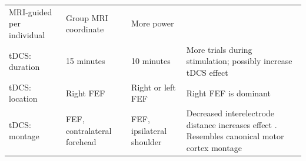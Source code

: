 \documentclass[11pt,]{memoir}
\begin{document}
\begin{longtable}[]{@{}llll@{}}
\begin{minipage}[t]{0.21\columnwidth}
MRI-guided per individual\strut
\end{minipage} & \begin{minipage}[t]{0.16\columnwidth}\raggedright
Group MRI coordinate\strut
\end{minipage} & \begin{minipage}[t]{0.38\columnwidth}\raggedright
More power \autocite{Sack2009}\strut
\end{minipage}\tabularnewline
\begin{minipage}[t]{0.14\columnwidth}\raggedright
tDCS: duration\strut
\end{minipage} & \begin{minipage}[t]{0.21\columnwidth}\raggedright
15 minutes\strut
\end{minipage} & \begin{minipage}[t]{0.16\columnwidth}\raggedright
10 minutes\strut
\end{minipage} & \begin{minipage}[t]{0.38\columnwidth}\raggedright
More trials during stimulation; possibly increase tDCS effect\strut
\end{minipage}\tabularnewline
\begin{minipage}[t]{0.14\columnwidth}\raggedright
tDCS: location\strut
\end{minipage} & \begin{minipage}[t]{0.21\columnwidth}\raggedright
Right FEF\strut
\end{minipage} & \begin{minipage}[t]{0.16\columnwidth}\raggedright
Right or left FEF\strut
\end{minipage} & \begin{minipage}[t]{0.38\columnwidth}\raggedright
Right FEF is dominant \autocite{Duecker2015}\strut
\end{minipage}\tabularnewline
\begin{minipage}[t]{0.14\columnwidth}\raggedright
tDCS: montage\strut
\end{minipage} & \begin{minipage}[t]{0.21\columnwidth}\raggedright
FEF, contralateral forehead\strut
\end{minipage} & \begin{minipage}[t]{0.16\columnwidth}\raggedright
FEF, ipsilateral shoulder\strut
\end{minipage} & \begin{minipage}[t]{0.38\columnwidth}\raggedright
Decreased interelectrode distance increases effect \autocites{Moliadze2010}{Opitz2015}. Resembles canonical motor cortex montage\strut

\end{minipage}
\end{longtable}
\end{document}
